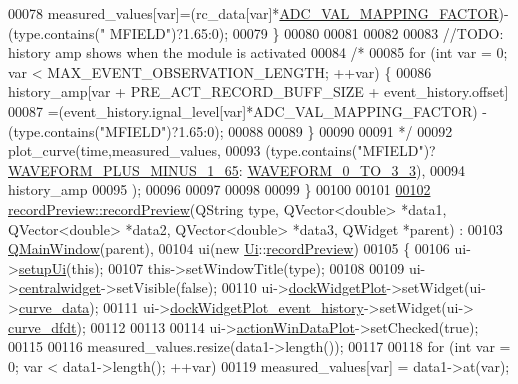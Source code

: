 \begin{DoxyCode}
00078         measured\_values[var]=(rc\_data[var]*\hyperlink{a00031_ada92d3eeeec0cbeee41e76a52d145792}{ADC\_VAL\_MAPPING\_FACTOR})-(type.contains(\textcolor{stringliteral}{"
      MFIELD"})?1.65:0);
00079     \}
00080 
00081 
00082 
00083     \textcolor{comment}{//TODO: history amp shows when the module is activated}
00084     \textcolor{comment}{/*}
00085 \textcolor{comment}{    for (int var = 0; var < MAX\_EVENT\_OBSERVATION\_LENGTH; ++var) \{}
00086 \textcolor{comment}{        history\_amp[var + PRE\_ACT\_RECORD\_BUFF\_SIZE + event\_history.offset]}
00087 \textcolor{comment}{                =(event\_history.ignal\_level[var]*ADC\_VAL\_MAPPING\_FACTOR) -
       (type.contains("MFIELD")?1.65:0);}
00088 \textcolor{comment}{}
00089 \textcolor{comment}{    \}}
00090 \textcolor{comment}{}
00091 \textcolor{comment}{    */}
00092     plot\_curve(time,measured\_values,
00093               (type.contains(\textcolor{stringliteral}{"MFIELD"})?\hyperlink{a00034_a0923d3b365a36e1e8c401cec964aa36f}{WAVEFORM\_PLUS\_MINUS\_1\_65}:
      \hyperlink{a00034_ae18fed2471b16a8516d721ff60671dd9}{WAVEFORM\_0\_TO\_3\_3}),
00094               history\_amp
00095               );
00096 
00097 
00098 
00099 \}
00100 
00101 
\hypertarget{a00042_source_l00102}{}\hyperlink{a00020_a3f26cea2101bdab013aa02f1c73e41b9}{00102} \hyperlink{a00020_a03ad4ae83a5594f6dc337c7b71873edd}{recordPreview::recordPreview}(QString type, QVector<double> *data1, 
      QVector<double> *data2, QVector<double> *data3, QWidget *parent) :
00103     \hyperlink{a00010}{QMainWindow}(parent),
00104     ui(new \hyperlink{a00055}{Ui}::\hyperlink{a00020}{recordPreview})
00105 \{
00106     ui->\hyperlink{a00028_afa41dc070a896a5eae476f3c0206825c}{setupUi}(\textcolor{keyword}{this});
00107     this->setWindowTitle(type);
00108 
00109     ui->\hyperlink{a00028_ac9ab4609922159e8e4cc45905f76928e}{centralwidget}->setVisible(\textcolor{keyword}{false});
00110     ui->\hyperlink{a00028_a07b76f17803ec09e0367b72938bbd097}{dockWidgetPlot}->setWidget(ui->\hyperlink{a00028_a247d94481323c0bc4f8b6458a8a535dd}{curve\_data});
00111     ui->\hyperlink{a00028_a2a8f7ee8d4458dd20481c8a1c29ce185}{dockWidgetPlot\_event\_history}->setWidget(ui->
      \hyperlink{a00028_a43d24fa14d90cc27b310542e39dcdd1b}{curve\_dfdt});
00112 
00113 
00114     ui->\hyperlink{a00028_aa09067a9c96c9cd78f75261a9fcb89f0}{actionWinDataPlot}->setChecked(\textcolor{keyword}{true});
00115 
00116     measured\_values.resize(data1->length());
00117 
00118     \textcolor{keywordflow}{for} (\textcolor{keywordtype}{int} var = 0; var < data1->length(); ++var)
00119       measured\_values[var] = data1->at(var);

\end{DoxyCode}
